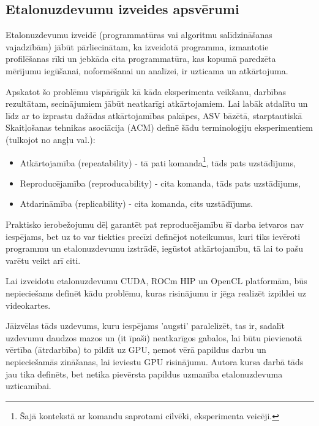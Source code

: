 \begin{center}
    \chapter{Etalonuzdevumu izveides apsvērumi}
\end{center}
Etalonuzdevumu izveidē (programmatūras vai algoritmu salīdzināšanas vajadzībām)
jābūt pārliecinātam, ka izveidotā programma, izmantotie profilēšanas rīki un
jebkāda cita programmatūra, kas kopumā paredzēta mērījumu iegūšanai,
noformēšanai un analīzei, ir uzticama un atkārtojuma.

Apskatot šo problēmu vispārīgāk kā kāda eksperimenta veikšanu, darbības
rezultātam, secinājumiem jābūt neatkarīgi atkārtojamiem. Lai labāk atdalītu un
līdz ar to izprastu dažādas atkārtojamības pakāpes, ASV bāzētā, starptautiskā
Skaitļošanas tehnikas asociācija (ACM) definē šādu terminoloģiju eksperimentiem
(tulkojot no angļu val.):
\cite{acm-experiment-terms}

\begin{itemize}
    \item Atkārtojamība (repeatability) - tā pati komanda\footnote{Šajā
        kontekstā ar komandu saprotami cilvēki, eksperimenta veicēji.}, tāds
        pats uzstādījums,
    \item Reproducējamība (reproducability) - cita komanda, tāds pats
        uzstādījums,
    \item Atdarināmība (replicability) -  cita komanda, cits uzstādījums.
\end{itemize}


Praktisko ierobežojumu dēļ garantēt pat reproducējamību šī darba ietvaros nav
iespējams, bet uz to var tiekties precīzi definējot noteikumus, kuri tiks
ievēroti programmu un etalonuzdevumu izstrādē, iegūstot atkārtojamību, tā lai
to pašu varētu veikt arī citi.

Lai izveidotu etalonuzdevumu CUDA, ROCm HIP un OpenCL platformām,
būs nepieciešams definēt kādu problēmu, kuras risinājumu ir jēga realizēt
izpildei uz videokartes.

Jāizvēlas tāds uzdevums, kuru iespējams 'augsti' paralelizēt, tas ir, sadalīt
uzdevumu daudzos mazos un (it īpaši) neatkarīgos gabalos, lai būtu pievienotā
vērtība (ātrdarbība) to pildīt uz GPU, ņemot vērā papildus darbu un
nepieciešamās zināšanas, lai ieviestu GPU risinājumu. Autora kursa
darbā\cite{kursa-darbs} tāds jau tika definēts, bet netika pievērsta papildus
uzmanība etalonuzdevuma uzticamībai.

